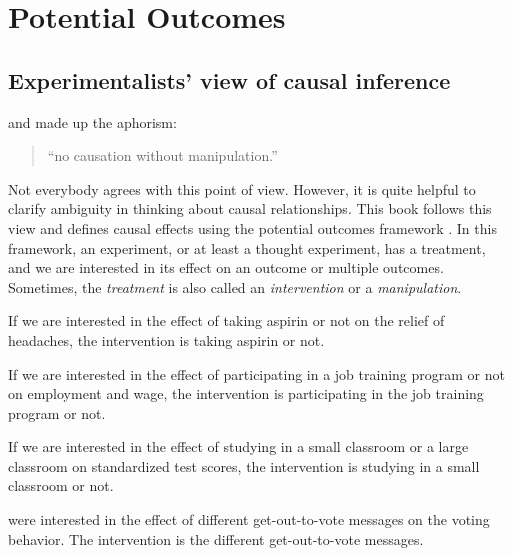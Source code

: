 \chapter{Potential Outcomes}
 \label{chapter::potential-outcomes}


\section{Experimentalists' view of causal inference}






\citet{rubin1975bayesian} and \citet{holland1986statistics} made up the aphorism:
\begin{quote}
``no causation without manipulation.''
\end{quote}
Not everybody agrees with this point of view. However, it is quite helpful to clarify ambiguity in thinking about causal relationships. This book follows this view and defines causal effects using the potential outcomes framework \citep{Neyman:1923, Rubin:1974}. In this framework, an experiment, or at least a thought experiment, has a treatment, and we are interested in its effect on an outcome or multiple outcomes. Sometimes, the {\it treatment} is also called an {\it intervention} or a {\it manipulation}. 


\begin{example}\label{eg::aspirin}
If we are interested in the effect of taking aspirin or not on the relief of headaches, the intervention is taking aspirin or not. 
\end{example}



\begin{example}\label{eg::jobtraining}
If we are interested in the effect of participating in a job training program or not on employment and wage, the intervention is participating in the job training program or not. 
\end{example}


\begin{example}\label{eg::classroom}
If we are interested in the effect of studying in a small classroom or a large classroom on standardized test scores, the intervention is studying in a small classroom or not. 
\end{example} 

\begin{example}\label{eg::gotv}
\citet{gerber2008social} were interested in the effect of different get-out-to-vote messages on the voting behavior. The intervention is the different get-out-to-vote messages. 
\end{example} 


